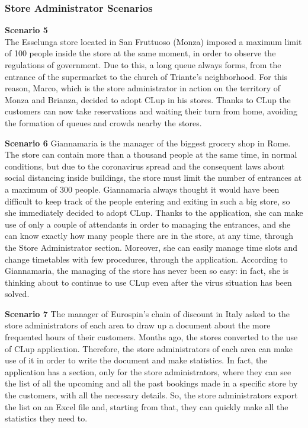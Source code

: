 \documentclass[table, 12pt]{article}
\begin{document}
\begin{minipage}{\textwidth}
    \subsubsection{Store Administrator Scenarios}
    \textbf{Scenario 5}\\
    The Esselunga store located in San Fruttuoso (Monza) imposed a maximum limit of 100 people inside the store at the same moment, in order to observe the regulations of government. Due to this, a long queue always forms, from the entrance of the supermarket to the church of Triante's neighborhood. For this reason, Marco, which is the store administrator in action on the territory of Monza and Brianza, decided to adopt CLup in his stores.
    Thanks to CLup the customers can now take reservations and waiting their turn from home, avoiding the formation of queues and crowds nearby the stores.\\

\end{minipage}

\begin{minipage}{\textwidth}
    \textbf{Scenario 6}
    Giannamaria is the manager of the biggest grocery shop in Rome. The store can contain more than a thousand people at the same time, in normal conditions, but due to the coronavirus spread and the consequent laws about social distancing inside buildings, the store must limit the number of entrances at a maximum of 300 people. Giannamaria always thought it would have been difficult to keep track of the people entering and exiting in such a big store, so she immediately decided to adopt CLup. Thanks to the application, she can make use of only a couple of attendants in order to managing the entrances, and she can know exactly how many people there are in the store, at any time, through the Store Administrator section. Moreover, she can easily manage time slots and change timetables with few procedures, through the application. According to Giannamaria, the managing of the store has never been so easy: in fact, she is thinking about to continue to use CLup even after the virus situation has been solved.\\
\end{minipage}

\begin{minipage}{\textwidth}
    \textbf{Scenario 7}
    The manager of Eurospin's chain of discount in Italy asked to the store administrators of each area to draw up a document about the more frequented hours of their customers. Months ago, the stores converted to the use of CLup application. Therefore, the store administrators of each area can make use of it in order to write the document and make statistics. In fact, the application has a section, only for the store administrators, where they can see the list of all the upcoming and all the past bookings made in a specific store by the customers, with all the necessary details. So, the store administrators export the list on an Excel file and, starting from that, they can quickly make all the statistics they need to.\\
\end{minipage}
\end{document}

